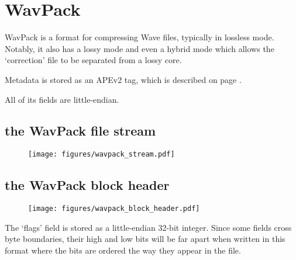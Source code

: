 
\chapter{WavPack}
WavPack is a format for compressing Wave files, typically in lossless mode.
Notably, it also has a lossy mode and even a hybrid mode which allows
the `correction' file to be separated from a lossy core.

Metadata is stored as an APEv2 tag, which is described on page \pageref{apev2}.

All of its fields are little-endian.

\section{the WavPack file stream}
\begin{figure}[h]
\texttt{[image: figures/wavpack\_stream.pdf]}
\end{figure}

\pagebreak

\section{the WavPack block header}
\begin{figure}[h]
\texttt{[image: figures/wavpack\_block\_header.pdf]}
\end{figure}
The `flags' field is stored as a little-endian 32-bit integer.
Since some fields cross byte boundaries, their high and low bits
will be far apart when written in this format where the bits are
ordered the way they appear in the file.

